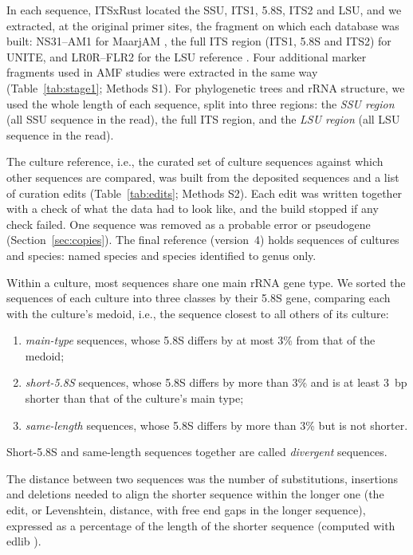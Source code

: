 \documentclass[11pt]{article}
\begin{document}
In each sequence, ITSxRust \cite{obrien2026itsxrust} located the SSU, ITS1, 5.8S, ITS2 and LSU, and we extracted, at
the original primer sites, the fragment on which each database was built: NS31--AM1 for MaarjAM
\cite{simon1992specific,helgason1998ploughing,opik2010maarjam}, the full ITS region (ITS1, 5.8S and ITS2) for UNITE,
and LR0R--FLR2 for the LSU reference \cite{bunyard1994morchella,trouvelot1999visualization,delavaux2021lsu}. Four
additional marker fragments used in AMF studies were extracted in the same way (Table~\ref{tab:stage1}; Methods
S1). For phylogenetic trees and rRNA structure, we used the whole length of each sequence, split into three regions:
the \emph{SSU region} (all SSU sequence in the read), the full ITS region, and the \emph{LSU region} (all LSU
sequence in the read).

The culture reference, i.e., the curated set of culture sequences against which other sequences are compared, was
built from the deposited sequences and a list of curation edits (Table~\ref{tab:edits}; Methods S2). Each edit was
written together with a check of what the data had to look like, and the build stopped if any check failed. One
sequence was removed as a probable error or pseudogene (Section~\ref{sec:copies}). The final reference (version~4)
holds \NCopiesRetained{} sequences of \NCultures{} cultures and \RefNames{} species: \NSpecies{} named species and
\RefGenusOnly{} species identified to genus only.

Within a culture, most sequences share one main rRNA gene type. We sorted the sequences of each culture into three
classes by their 5.8S gene, comparing each with the culture's medoid, i.e., the sequence closest to all others of
its culture:
\begin{enumerate}
\item \emph{main-type} sequences, whose 5.8S differs by at most 3\% from that of the medoid;
\item \emph{short-5.8S} sequences, whose 5.8S differs by more than 3\% and is at least 3~bp shorter than that of
the culture's main type;
\item \emph{same-length} sequences, whose 5.8S differs by more than 3\% but is not shorter.
\end{enumerate}
Short-5.8S and same-length sequences together are called \emph{divergent} sequences.

The distance between two sequences was the number of substitutions, insertions and deletions needed to align the
shorter sequence within the longer one (the edit, or Levenshtein, distance, with free end gaps in the longer
sequence), expressed as a percentage of the length of the shorter sequence (computed with edlib
\cite{sosic2017edlib}).
\end{document}

